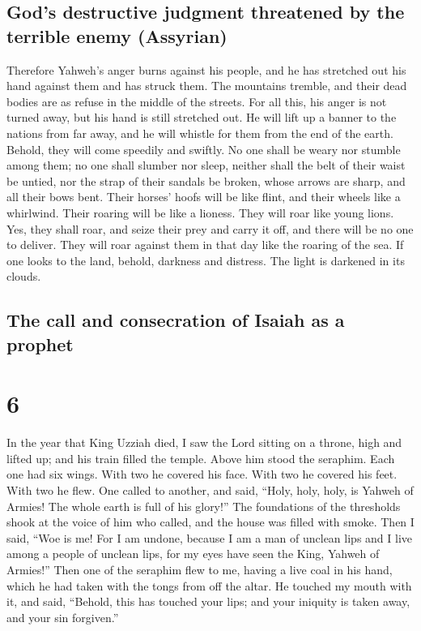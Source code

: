 \hypertarget{gods-destructive-judgment-threatened-by-the-terrible-enemy-assyrian}{%
\subsection{God's destructive judgment threatened by the terrible enemy
(Assyrian)}\label{gods-destructive-judgment-threatened-by-the-terrible-enemy-assyrian}}

 Therefore Yahweh's anger burns against his people, and
he has stretched out his hand against them and has struck them. The
mountains tremble, and their dead bodies are as refuse in the middle of
the streets. For all this, his anger is not turned away, but his hand is
still stretched out.  He will lift up a banner to the
nations from far away, and he will whistle for them from the end of the
earth. Behold, they will come speedily and swiftly.  No
one shall be weary nor stumble among them; no one shall slumber nor
sleep, neither shall the belt of their waist be untied, nor the strap of
their sandals be broken,  whose arrows are sharp, and all
their bows bent. Their horses' hoofs will be like flint, and their
wheels like a whirlwind.  Their roaring will be like a
lioness. They will roar like young lions. Yes, they shall roar, and
seize their prey and carry it off, and there will be no one to deliver.
 They will roar against them in that day like the roaring
of the sea. If one looks to the land, behold, darkness and distress. The
light is darkened in its clouds.

\hypertarget{the-call-and-consecration-of-isaiah-as-a-prophet}{%
\subsection{The call and consecration of Isaiah as a
prophet}\label{the-call-and-consecration-of-isaiah-as-a-prophet}}

\hypertarget{section-5}{%
\section{6}\label{section-5}}

 In the year that King Uzziah died, I saw the Lord sitting
on a throne, high and lifted up; and his train filled the temple.
 Above him stood the seraphim. Each one had six wings.
With two he covered his face. With two he covered his feet. With two he
flew.  One called to another, and said, ``Holy, holy,
holy, is Yahweh of Armies! The whole earth is full of his glory!''
 The foundations of the thresholds shook at the voice of
him who called, and the house was filled with smoke.  Then
I said, ``Woe is me! For I am undone, because I am a man of unclean lips
and I live among a people of unclean lips, for my eyes have seen the
King, Yahweh of Armies!''  Then one of the seraphim flew
to me, having a live coal in his hand, which he had taken with the tongs
from off the altar.  He touched my mouth with it, and
said, ``Behold, this has touched your lips; and your iniquity is taken
away, and your sin forgiven.''

